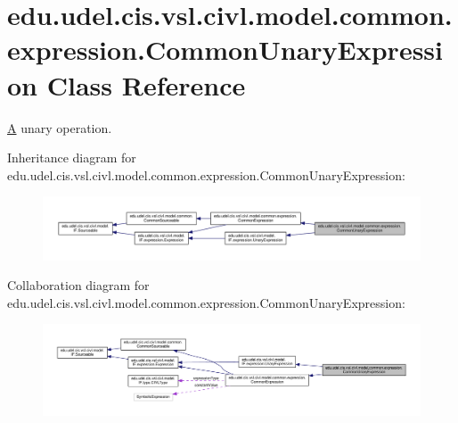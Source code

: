 \hypertarget{classedu_1_1udel_1_1cis_1_1vsl_1_1civl_1_1model_1_1common_1_1expression_1_1CommonUnaryExpression}{}\section{edu.\+udel.\+cis.\+vsl.\+civl.\+model.\+common.\+expression.\+Common\+Unary\+Expression Class Reference}
\label{classedu_1_1udel_1_1cis_1_1vsl_1_1civl_1_1model_1_1common_1_1expression_1_1CommonUnaryExpression}


\hyperlink{structA}{A} unary operation.  




Inheritance diagram for edu.\+udel.\+cis.\+vsl.\+civl.\+model.\+common.\+expression.\+Common\+Unary\+Expression\+:
\nopagebreak
\begin{figure}[H]
\begin{center}
\leavevmode
\includegraphics[width=350pt]{classedu_1_1udel_1_1cis_1_1vsl_1_1civl_1_1model_1_1common_1_1expression_1_1CommonUnaryExpression__inherit__graph}
\end{center}
\end{figure}


Collaboration diagram for edu.\+udel.\+cis.\+vsl.\+civl.\+model.\+common.\+expression.\+Common\+Unary\+Expression\+:
\nopagebreak
\begin{figure}[H]
\begin{center}
\leavevmode
\includegraphics[width=350pt]{classedu_1_1udel_1_1cis_1_1vsl_1_1civl_1_1model_1_1common_1_1expression_1_1CommonUnaryExpression__coll__graph}
\end{center}
\end{figure}
